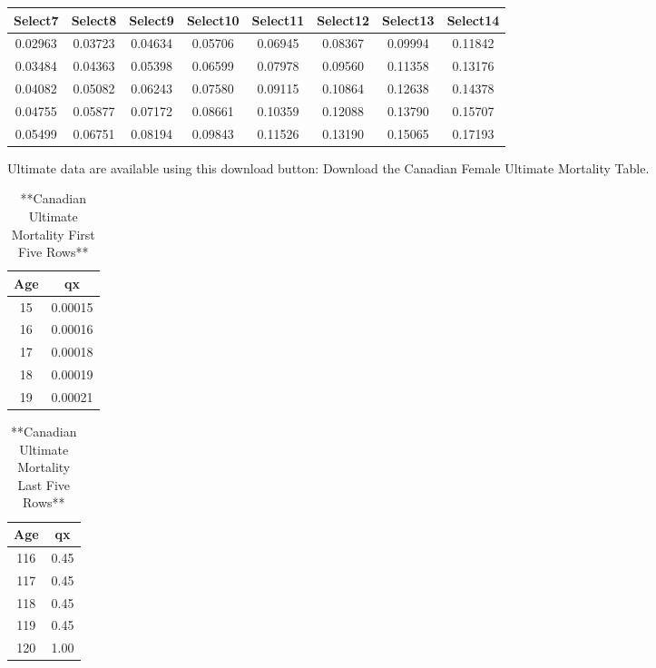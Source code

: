 \documentclass[
]{book}
\begin{document}
\begin{tabular}{c|c|c|c|c|c|c|c}
\hline
Select7 & Select8 & Select9 & Select10 & Select11 & Select12 & Select13 & Select14\\
\hline
0.02963 & 0.03723 & 0.04634 & 0.05706 & 0.06945 & 0.08367 & 0.09994 & 0.11842\\
\hline
0.03484 & 0.04363 & 0.05398 & 0.06599 & 0.07978 & 0.09560 & 0.11358 & 0.13176\\
\hline
0.04082 & 0.05082 & 0.06243 & 0.07580 & 0.09115 & 0.10864 & 0.12638 & 0.14378\\
\hline
0.04755 & 0.05877 & 0.07172 & 0.08661 & 0.10359 & 0.12088 & 0.13790 & 0.15707\\
\hline
0.05499 & 0.06751 & 0.08194 & 0.09843 & 0.11526 & 0.13190 & 0.15065 & 0.17193\\
\hline
\end{tabular}

Ultimate data are available using this download button:
Download the Canadian Female Ultimate Mortality Table.

\begin{table}

\caption{\label{tab:unnamed-chunk-22}**Canadian  Ultimate Mortality First Five Rows**}
\centering
\begin{tabular}[t]{c|c}
\hline
Age & qx\\
\hline
15 & 0.00015\\
\hline
16 & 0.00016\\
\hline
17 & 0.00018\\
\hline
18 & 0.00019\\
\hline
19 & 0.00021\\
\hline
\end{tabular}
\end{table}

\begin{table}

\caption{\label{tab:unnamed-chunk-22}**Canadian Ultimate Mortality Last Five Rows**}
\centering
\begin{tabular}[t]{c|c}
\hline
Age & qx\\
\hline
116 & 0.45\\
\hline
117 & 0.45\\
\hline
118 & 0.45\\
\hline
119 & 0.45\\
\hline
120 & 1.00\\
\hline
\end{tabular}
\end{table}
\end{document}
